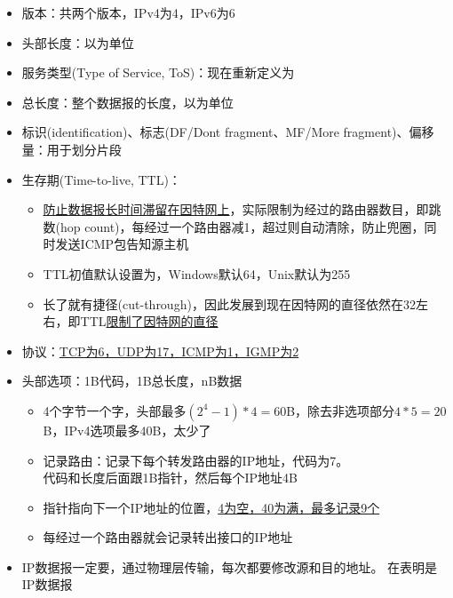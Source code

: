 \begin{itemize}
\item 版本：共两个版本，IPv4为4，IPv6为6
\item 头部长度：以为单位
\item 服务类型(Type of Service, ToS)：现在重新定义为
\item 总长度：整个数据报的长度，以为单位
\item 标识(identification)、标志(DF/Dont fragment、MF/More fragment)、偏移量：用于划分片段
\item 生存期(Time-to-live, TTL)：
\begin{itemize}
	\item \underline{防止数据报长时间滞留在因特网上}，实际限制为经过的路由器数目，即跳数(hop count)，每经过一个路由器减1，超过则自动清除，防止兜圈，同时发送ICMP包告知源主机
	\item TTL初值默认设置为，Windows默认64，Unix默认为255
	\item 长了就有捷径(cut-through)，因此发展到现在因特网的直径依然在32左右，即TTL\underline{限制了因特网的直径}
\end{itemize}
\item 协议：\underline{TCP为6，UDP为17，ICMP为1，IGMP为2}
\item 头部选项：1B代码，1B总长度，nB数据
\begin{itemize}
	\item 4个字节一个字，头部最多$(2^4-1)*4=60$B，除去非选项部分$4*5=20$B，IPv4选项最多$40$B，太少了
	\item 记录路由：记录下每个转发路由器的IP地址，代码为7。\\
	代码和长度后面跟1B指针，然后每个IP地址4B
	\item 指针指向下一个IP地址的位置，\underline{4为空，40为满，最多记录9个}
	\item 每经过一个路由器就会记录转出接口的IP地址
\end{itemize}
\item IP数据报一定要，通过物理层传输，每次都要修改源和目的地址。
在表明是IP数据报
\end{itemize}

